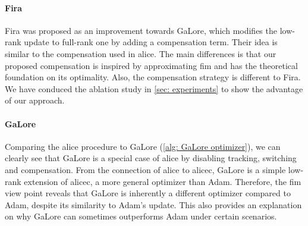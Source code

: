 \paragraph{Fira}
Fira \cite{chen2024fira} was proposed as an improvement towards GaLore, which modifies the low-rank update to full-rank one by adding a compensation term. Their idea is similar to the compensation used in \gls{alice}. The main differences is that our proposed compensation is inspired by approximating \gls{fim} and has the theoretical foundation on its optimality. Also, the compensation strategy is different to Fira. We have conduced the ablation study in \cref{sec: experiments} to show the advantage of our approach. 

\paragraph{GaLore}
Comparing the \gls{alice} procedure to GaLore (\cref{alg: GaLore optimizer}), we can clearly see that GaLore is a special case of \gls{alice} by disabling tracking, switching and compensation. From the connection of \gls{alice} to \gls{alicec}, GaLore is a simple low-rank extension of \gls{alicec}, a more general optimizer than Adam. Therefore, the \gls{fim} view point reveals that GaLore is inherently a different optimizer compared to Adam, despite its similarity to Adam's update. This also provides an explanation on why GaLore can sometimes outperforms Adam under certain scenarios. 



